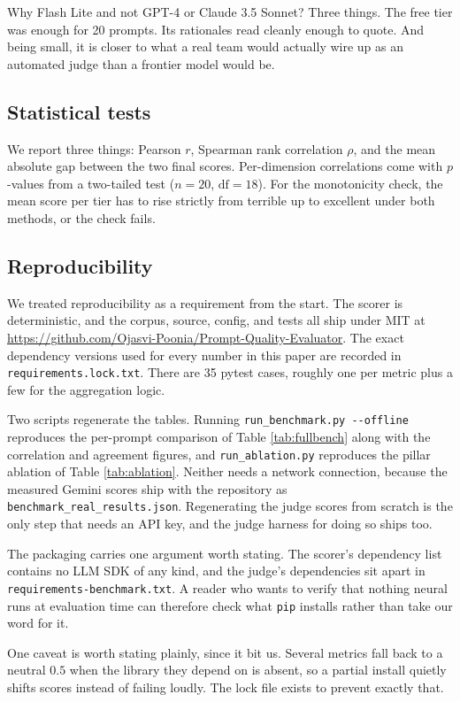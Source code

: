 \documentclass[conference]{IEEEtran}
\begin{document}
Why Flash Lite and not GPT-4 or Claude 3.5 Sonnet? Three things. The free tier was enough for 20 prompts. Its rationales read cleanly enough to quote. And being small, it is closer to what a real team would actually wire up as an automated judge than a frontier model would be.

\subsection{Statistical tests}
We report three things: Pearson $r$, Spearman rank correlation $\rho$, and the mean absolute gap between the two final scores. Per-dimension correlations come with $p$-values from a two-tailed test ($n = 20$, $\text{df} = 18$). For the monotonicity check, the mean score per tier has to rise strictly from terrible up to excellent under both methods, or the check fails.

\subsection{Reproducibility}
We treated reproducibility as a requirement from the start. The scorer is deterministic, and the corpus, source, config, and tests all ship under MIT at \url{https://github.com/Ojasvi-Poonia/Prompt-Quality-Evaluator}. The exact dependency versions used for every number in this paper are recorded in \texttt{requirements.lock.txt}. There are 35 pytest cases, roughly one per metric plus a few for the aggregation logic.

Two scripts regenerate the tables. Running \texttt{run\_benchmark.py -{}-offline} reproduces the per-prompt comparison of Table \ref{tab:fullbench} along with the correlation and agreement figures, and \texttt{run\_ablation.py} reproduces the pillar ablation of Table \ref{tab:ablation}. Neither needs a network connection, because the measured Gemini scores ship with the repository as \texttt{benchmark\_real\_results.json}. Regenerating the judge scores from scratch is the only step that needs an API key, and the judge harness for doing so ships too.

The packaging carries one argument worth stating. The scorer's dependency list contains no LLM SDK of any kind, and the judge's dependencies sit apart in \texttt{requirements-benchmark.txt}. A reader who wants to verify that nothing neural runs at evaluation time can therefore check what \texttt{pip} installs rather than take our word for it.

One caveat is worth stating plainly, since it bit us. Several metrics fall back to a neutral $0.5$ when the library they depend on is absent, so a partial install quietly shifts scores instead of failing loudly. The lock file exists to prevent exactly that.
\end{document}
